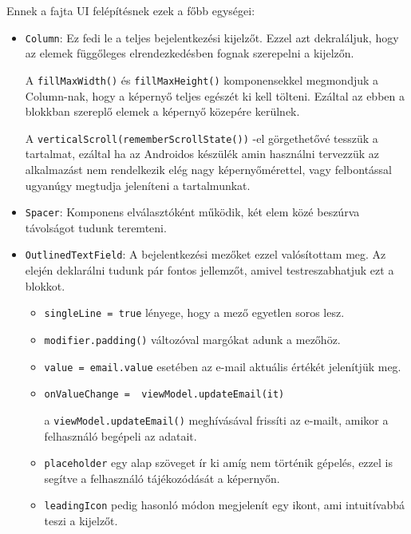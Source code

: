 Ennek a fajta UI felépítésnek ezek a főbb egységei:
\begin{itemize}
    \item \texttt{Column}: Ez fedi le a teljes bejelentkezési kijelzőt. Ezzel azt dekraláljuk, hogy az elemek függőleges elrendezkedésben fognak szerepelni a kijelzőn.

    A \texttt{fillMaxWidth()} és \texttt{fillMaxHeight()} komponensekkel megmondjuk a
    \newline
    Column-nak, hogy a képernyő teljes egészét ki kell tölteni. Ezáltal az ebben a blokkban szereplő elemek a képernyő közepére kerülnek.

    A \texttt{verticalScroll(rememberScrollState())} -el görgethetővé tesszük a tartalmat, ezáltal ha az Androidos készülék amin használni tervezzük az alkalmazást nem rendelkezik elég nagy képernyőmérettel, vagy felbontással ugyanúgy megtudja jeleníteni a tartalmunkat.

    \item \texttt{Spacer}: Komponens elválasztóként működik, két elem közé beszúrva távolságot tudunk teremteni.

    \item \texttt{OutlinedTextField}: A bejelentkezési mezőket ezzel valósítottam meg. Az elején deklarálni tudunk pár fontos jellemzőt, amivel testreszabhatjuk ezt a blokkot.

    \begin{itemize}
        \item \texttt{singleLine = true} lényege, hogy a mező egyetlen soros lesz.
        \item \texttt{modifier.padding()} változóval margókat adunk a mezőhöz.
        \item \texttt{value = email.value} esetében az e-mail aktuális értékét jelenítjük meg.
        \item \texttt{onValueChange = { viewModel.updateEmail(it) }}
        
        a \texttt{viewModel.updateEmail()} meghívásával frissíti az e-mailt, amikor a felhasználó begépeli az adatait.
        \item \texttt{placeholder} egy alap szöveget ír ki amíg nem történik gépelés, ezzel is segítve a felhasználó tájékozódását a képernyőn.
        \item \texttt{leadingIcon} pedig hasonló módon megjelenít egy ikont, ami intuitívabbá teszi a kijelzőt.
    \end{itemize}
\end{itemize}

